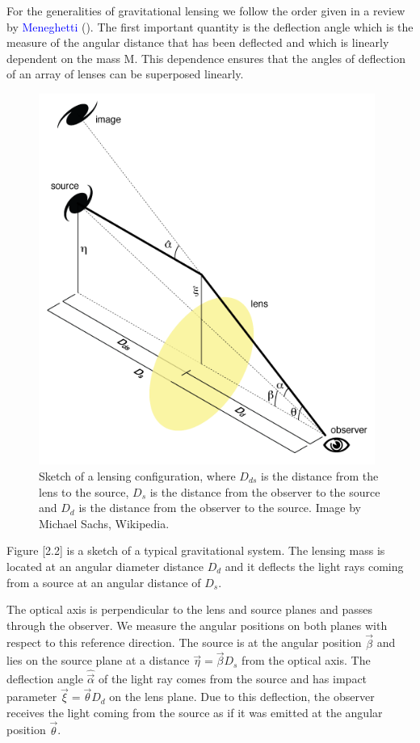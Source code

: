 For the generalities of gravitational lensing we follow the order given in a review by \textcolor{blue}{Meneghetti} (\citeyear{Reference26}). The first important quantity is the deflection angle which is the measure of the angular distance that has been deflected and which is linearly dependent on the mass $\text{M}$. This dependence ensures that the angles of deflection of an array of lenses can be superposed linearly.

\begin{figure}[H]
\centering
\includegraphics[width=11cm]{images/lensing.png}
\caption[Angles in gravitational lensing]{Sketch of a lensing configuration, where $D_{ds}$ is the distance from the lens to the source, $D_s$ is the distance from the observer to the source and $D_d$ is the distance from the observer to the source. Image by Michael Sachs, Wikipedia.}
\end{figure}

Figure [2.2] is a sketch of a typical gravitational system. The lensing mass is located at an angular diameter distance $D_d$ and it deflects the light rays coming from a source at an angular distance of $D_s$.

The optical axis is perpendicular to the lens and source planes and passes through the observer. We measure the angular positions on both planes with respect to this reference direction. The source is at the angular position $\vec{\beta}$ and lies on the source plane at a distance $\vec{\eta}=\vec{\beta}D_s$ from the optical axis. The deflection angle $\hat{\vec{\alpha}}$ of the light ray comes from the source and has impact parameter $\vec{\xi}=\vec{\theta}D_d$ on the lens plane. Due to this deflection, the observer receives the light coming from the source as if it was emitted at the angular position $\vec{\theta}$.

